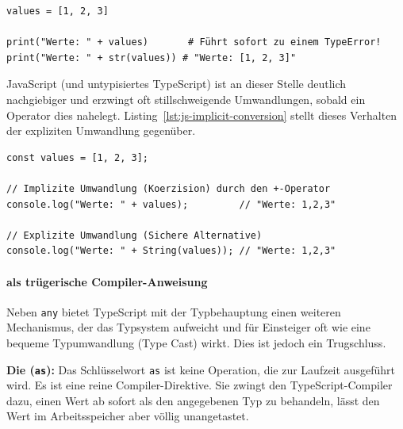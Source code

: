 \begin{listing}[htbp]
    \caption{Explizite Umwandlung in Python}
    \label{lst:python-explicit-conversion}
    \begin{verbatim}
values = [1, 2, 3]

print("Werte: " + values)       # Führt sofort zu einem TypeError!
print("Werte: " + str(values)) # "Werte: [1, 2, 3]"
    \end{verbatim}
\end{listing}

JavaScript (und untypisiertes TypeScript) ist an dieser Stelle deutlich nachgiebiger und erzwingt oft stillschweigende Umwandlungen, sobald ein Operator dies nahelegt. Listing~\ref{lst:js-implicit-conversion} stellt dieses Verhalten der expliziten Umwandlung gegenüber.

\begin{listing}[htbp]
    \caption{Implizite und explizite Umwandlung in JavaScript}
    \label{lst:js-implicit-conversion}
    \begin{verbatim}
const values = [1, 2, 3];

// Implizite Umwandlung (Koerzision) durch den +-Operator
console.log("Werte: " + values);         // "Werte: 1,2,3"

// Explizite Umwandlung (Sichere Alternative)
console.log("Werte: " + String(values)); // "Werte: 1,2,3"
    \end{verbatim}
\end{listing}

\paragraph{ als trügerische Compiler-Anweisung}
\label{par:as-in-typescript}

Neben \texttt{any} bietet TypeScript mit der Typbehauptung einen weiteren Mechanismus, der das Typsystem aufweicht und für Einsteiger oft wie eine bequeme Typumwandlung (Type Cast) wirkt. Dies ist jedoch ein Trugschluss.

\begin{definition}
\label{def:ts-as}
\textbf{Die  (\texttt{as}):} Das Schlüsselwort \texttt{as} ist keine Operation, die zur Laufzeit ausgeführt wird. Es ist eine reine Compiler-Direktive. Sie zwingt den TypeScript-Compiler dazu, einen Wert ab sofort als den angegebenen Typ zu behandeln, lässt den Wert im Arbeitsspeicher aber völlig unangetastet.
\end{definition}

